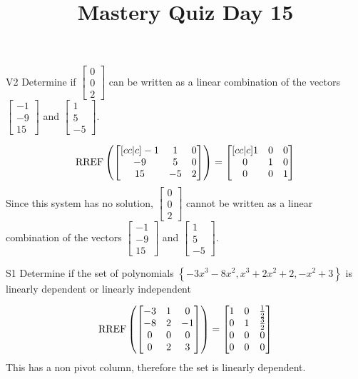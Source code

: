 \documentclass{sbgLAquiz}
\title{Mastery Quiz Day 15 }
\begin{document}
\begin{problem}{V2}
Determine if  $\begin{bmatrix} 0 \\ 0 \\ 2 \end{bmatrix}$ can be written as a linear combination of the vectors $\begin{bmatrix} -1 \\ -9 \\ 15 \end{bmatrix}$ and $\begin{bmatrix} 1 \\ 5 \\ -5 \end{bmatrix}$.
\end{problem}
\begin{solution}
$$\operatorname{RREF}\left(\begin{bmatrix}[cc|c] -1 & 1 & 0 \\ -9 & 5 & 0 \\ 15 & -5 & 2 \end{bmatrix} \right) = \begin{bmatrix}[cc|c] 1 & 0 & 0 \\ 0 & 1 & 0 \\ 0 & 0 & 1 \end{bmatrix}$$
Since this system has no solution, $\begin{bmatrix} 0 \\ 0 \\ 2 \end{bmatrix}$ cannot be written as a linear combination of the vectors $\begin{bmatrix} -1 \\ -9 \\ 15 \end{bmatrix}$ and $\begin{bmatrix} 1 \\ 5 \\ -5 \end{bmatrix}$.

\end{solution}


\begin{problem}{S1}
Determine if the set of polynomials $\left\{ -3x^3-8x^2, x^3+2x^2+2, -x^2+3\right\}$ is  linearly dependent or linearly independent
\end{problem}
\begin{solution}
$$\operatorname{RREF}\left( \begin{bmatrix}-3 & 1 & 0 \\ -8 & 2 & -1 \\ 0 & 0 & 0 \\ 0 & 2 & 3 \end{bmatrix}\right) = \begin{bmatrix} 1 & 0 & \frac{1}{2} \\ 0 & 1 & \frac{3}{2} \\ 0 & 0 & 0 \\ 0 & 0 & 0 \end{bmatrix}$$ 
This has a non pivot column, therefore the set is linearly dependent.
\end{solution}
\end{document}
